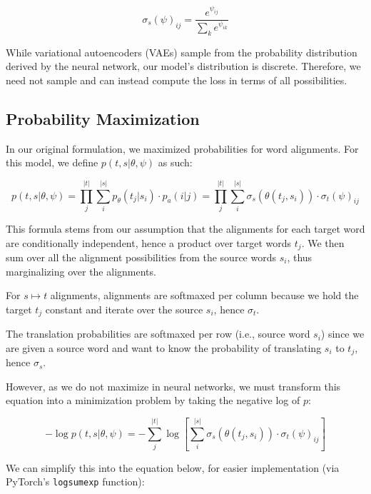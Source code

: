 \documentclass[twoside,twocolumn]{article}
\newlength\mystoreparindent
\newenvironment{myparindent}[1]{%
  \setlength{\mystoreparindent}{\the\parindent}
  \setlength{\parindent}{#1}
  }{%
  \setlength{\parindent}{\mystoreparindent}
}
\begin{document}
\begin{myparindent}{0pt}
\begin{equation}
  \sigma_s(\psi)_{ij} = \frac{e^{\psi_{ij}}}{\sum_{k} e^{\psi_{ik}}}
\end{equation}

While variational autoencoders (VAEs) sample from the probability distribution
derived by the neural network, our model's distribution is discrete.
Therefore, we need not sample and can instead compute the loss in terms of all
possibilities.

\subsection{Probability Maximization}

In our original formulation, we maximized probabilities for word alignments.
For this model, we define $p(t, s | \theta, \psi)$ as such:

\begin{equation}
  p(t, s | \theta, \psi)
    = \prod_j^{|t|} \sum_i^{|s|} p_\theta(t_j| s_i) \cdot p_a(i|j)
    = \prod_j^{|t|} \sum_i^{|s|} \sigma_s(\theta(t_j, s_i)) \cdot \sigma_t(\psi)_{ij}
\end{equation}

This formula stems from our assumption that the alignments for each target word
are conditionally independent, hence a product over target words $t_j$. We then
sum over all the alignment possibilities from the source words $s_i$, thus
marginalizing over the alignments.

For $s \mapsto t$ alignments, alignments are softmaxed per column because we
hold the target $t_j$ constant and iterate over the source $s_i$, hence
$\sigma_t$.

The translation probabilities are softmaxed per row (i.e., source word $s_i$)
since we are given a source word and want to know the probability of
translating $s_i$ to $t_j$, hence $\sigma_s$.

However, as we do not maximize in neural networks, we must transform this
equation into a minimization problem by taking the negative log of $p$:

\begin{equation}
  -\log p(t, s | \theta, \psi) =
  - \sum_j^{|t|}
     \log \left[ \sum_i^{|s|} \sigma_s \left( \theta(t_j, s_i) \right) \cdot
      \sigma_t(\psi)_{ij} \right]
\end{equation}

We can simplify this into the equation below, for easier implementation
(via PyTorch's \texttt{logsumexp} function):


\end{myparindent}
\end{document}

